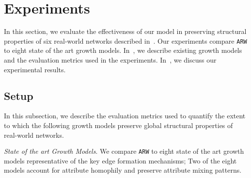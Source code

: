 \section{Experiments}
\label{sec:Experiments}
In this section, we evaluate the effectiveness of our model in preserving
structural properties of six real-world networks described in~.
Our experiments compare \texttt{ARW} to eight state of the art growth models.
In~, we describe existing growth models and the evaluation metrics
used in the experiments. In~, we discuss our
experimental results.

\subsection{Setup}
\label{sub:Experimental Setup}

In this subsection, we describe the evaluation metrics used to quantify the extent to
which the following growth models preserve global structural properties of real-world networks.

\textit{State of the art Growth Models}. We compare \texttt{ARW} to eight state of the art
growth models representative of the key edge formation
mechanisms; Two of the eight models account for attribute homophily
and preserve attribute mixing patterns.

